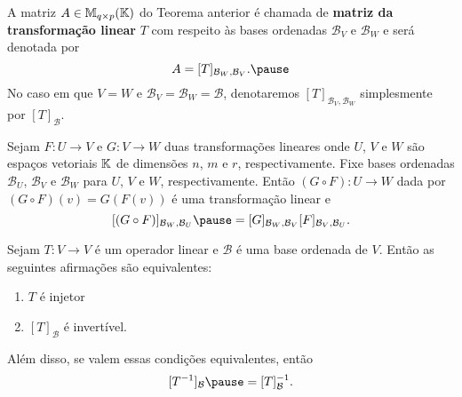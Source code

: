 \documentclass{beamer}
\begin{document}
\begin{frame}
    \begin{definicao}
        A matriz $A \in \mathbb{M}_{q\times p}(\mathbb{K})$ do Teorema anterior \pause é chamada de \textbf{matriz da transformação linear} \pause $T$ com respeito às bases ordenadas $\mathcal{B}_V$ e $\mathcal{B}_W$ \pause e será denotada por\pause
        \[
            A = [T]_{\mathcal{B}_{W},\mathcal{B}_{V}}.\pause
        \]
        No caso em que $V = W$ \pause e $\mathcal{B}_V = \mathcal{B}_W = \mathcal{B}$,  denotaremos $[T]_{\mathcal{B}_{V},\mathcal{B}_{W}}$ \pause simplesmente por $[T]_\mathcal{B}$.
    \end{definicao}
\end{frame}

\begin{frame}
    \begin{teorema}
        Sejam $F \colon U \to V$ \pause e $G \colon V \to W$ \pause duas transformações lineares onde $U$, $V$ e $W$ \pause são espaços vetoriais $\mathbb{K}$ \pause de dimensões $n$, $m$ e $r$, respectivamente. \pause Fixe bases ordenadas $\mathcal{B}_U$, \pause $\mathcal{B}_V$ \pause e $\mathcal{B}_W$ \pause para $U$, $V$ e $W$, respectivamente. \pause Então $(G \circ F) \colon U \to W$ \pause dada por $(G\circ F)(v) = G(F(v))$ \pause é uma transformação linear e\pause
        \[
            [(G \circ F)]_{{\mathcal{B}_W},{\mathcal{B}_U}} \pause = [G]_{{\mathcal{B}_W},{\mathcal{B}_V}}[F]_{{\mathcal{B}_V},{\mathcal{B}_U}}.
        \]
    \end{teorema}
\end{frame}

\begin{frame}
    \begin{teorema}
        Sejam $T \colon V \to V$ é um operador linear \pause e $\mathcal{B}$ é uma base ordenada de $V$. \pause Então as seguintes afirmações são equivalentes:\pause
        \begin{enumerate}[label={\roman*})]
            \item $T$ é injetor\pause

            \vspace{1cm}

            \item $[T]_\mathcal{B}$ é invertível.\pause
        \end{enumerate}

        \vspace{.2cm}

        Além disso, se valem essas condições equivalentes, então\pause
        \[
            [T^{-1}]_\mathcal{B} \pause = [T]_\mathcal{B}^{-1}.
        \]
    \end{teorema}
\end{frame}
\end{document}

